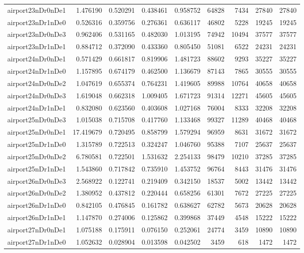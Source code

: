 \begin{longtable}{|l|r|r|r|r|r|r|r|r|}
airport23nDr0nDe1 & 1.476190 & 0.520291 & 0.438461 & 0.958752 & 64828 & 7434 & 27840 & 27840 \\
airport23nDr1nDe0 & 0.526316 & 0.359756 & 0.276361 & 0.636117 & 46802 & 5228 & 19245 & 19245 \\
airport23nDr0nDe3 & 0.962406 & 0.531165 & 0.482030 & 1.013195 & 74942 & 10494 & 37577 & 37577 \\
airport23nDr1nDe1 & 0.884712 & 0.372090 & 0.433360 & 0.805450 & 51081 & 6522 & 24231 & 24231 \\
airport24nDr0nDe1 & 0.571429 & 0.661817 & 0.819906 & 1.481723 & 88602 & 9293 & 35227 & 35227 \\
airport24nDr1nDe0 & 1.157895 & 0.674179 & 0.462500 & 1.136679 & 87143 & 7865 & 30555 & 30555 \\
airport24nDr0nDe2 & 1.047619 & 0.655374 & 0.764231 & 1.419605 & 89988 & 10764 & 40658 & 40658 \\
airport24nDr0nDe3 & 1.619048 & 0.662318 & 1.009405 & 1.671723 & 91314 & 12271 & 45605 & 45605 \\
airport24nDr1nDe1 & 0.832080 & 0.623560 & 0.403608 & 1.027168 & 76004 & 8333 & 32208 & 32208 \\
airport25nDr0nDe3 & 1.015038 & 0.715708 & 0.417760 & 1.133468 & 99327 & 11289 & 40468 & 40468 \\
airport25nDr0nDe1 & 17.419679 & 0.720495 & 0.858799 & 1.579294 & 96959 & 8631 & 31672 & 31672 \\
airport25nDr1nDe0 & 1.315789 & 0.722513 & 0.324247 & 1.046760 & 95388 & 7107 & 25637 & 25637 \\
airport25nDr0nDe2 & 6.780581 & 0.722501 & 1.531632 & 2.254133 & 98479 & 10210 & 37285 & 37285 \\
airport25nDr1nDe1 & 1.543860 & 0.717842 & 0.735910 & 1.453752 & 96764 & 8443 & 31476 & 31476 \\
airport26nDr0nDe3 & 2.568922 & 0.122741 & 0.219409 & 0.342150 & 18537 & 5002 & 13442 & 13442 \\
airport26nDr0nDe2 & 1.380952 & 0.437812 & 0.220444 & 0.658256 & 61301 & 7672 & 27225 & 27225 \\
airport26nDr1nDe0 & 0.842105 & 0.476845 & 0.161782 & 0.638627 & 62782 & 5673 & 20628 & 20628 \\
airport26nDr1nDe1 & 1.147870 & 0.274006 & 0.125862 & 0.399868 & 37449 & 4548 & 15222 & 15222 \\
airport27nDr0nDe1 & 1.075188 & 0.175911 & 0.076150 & 0.252061 & 24774 & 3459 & 10890 & 10890 \\
airport27nDr1nDe0 & 1.052632 & 0.028904 & 0.013598 & 0.042502 & 3459 & 618 & 1472 & 1472 \\

\end{longtable}
